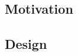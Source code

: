 \subsection{Motivation}
\label{sec:goto_motivation}

\lipsum{}

\subsection{Design}
\label{sec:goto_design}

\lipsum{}
